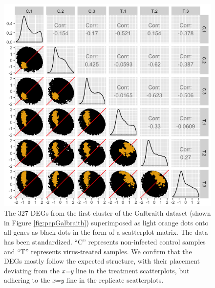 \documentclass[11pt,a4paper,oldfontcommands,openany]{memoir}
\numberwithin{equation}{section} %
\begin{document}
\begin{figure}[H]
\begin{framed}
  \includegraphics[width=\textwidth]{Images/GalbraithClust1SM}
\end{framed}
  \caption{The 327 DEGs from the first cluster of the Galbraith dataset (shown in Figure \ref{fig:pcpGalbraith}) superimposed as light orange dots onto all genes as black dots in the form of a scatterplot matrix. The data has been standardized. ``C'' represents non-infected control samples and ``T'' represents virus-treated samples. We confirm that the DEGs mostly follow the expected structure, with their placement deviating from the \textit{x=y} line in the treatment scatterplots, but adhering to the \textit{x=y} line in the replicate scatterplots.}
  \label{fig:GalbraithClust1SM}
\end{figure}
\end{document}
